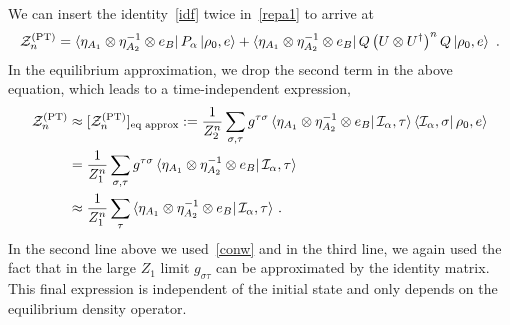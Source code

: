 \documentclass[a4paper,11pt]{article}
\newcommand\sig{\sigma}
\newcommand\da{{\dagger}}
\begin{document}
We can insert the identity~\eqref{idf} twice in~\eqref{repa1} to arrive at
\begin{align}
\label{PQ}
 \mathcal{Z}_n^{\rm (PT)} = \bra{\eta_{A_1} \otimes \eta^{-1}_{A_2} \otimes e_{B}}P_{\alpha}\ket{\rho_0, e} + \bra{\eta_{A_1} \otimes \eta^{-1}_{A_2} \otimes e_{B}}Q\left( U\otimes U^\da \right)^nQ\ket{\rho_0, e} \ .
\end{align}
In the equilibrium approximation, we drop the second term in the above equation, which leads to a time-independent expression, 
\begin{align}
 \mathcal{Z}_n^{(\rm PT)} &\approx [\mathcal{Z}_{n}^{(\rm PT)}]_{\text{eq approx}} := \frac{1}{Z_2^n} \sum_{\sigma, \tau} g^{\tau \sigma}\bra{\eta_{A_1} \otimes \eta^{-1}_{A_2} \otimes e_{B}}\mathcal{I}_{\alpha},\tau\rangle\bra{\mathcal{I}_{\alpha},\sigma}\rho_0,e\rangle
 \nonumber
 \\
 &=\frac{1}{Z_1^n} \sum_{\sigma, \tau} g^{\tau \sigma}\bra{\eta_{A_1} \otimes \eta^{-1}_{A_2} \otimes e_{B}}\mathcal{I}_{\alpha},\tau\rangle
 \nonumber
 \\
 &\approx\frac{1}{Z_1^n} \sum_{ \tau}\bra{\eta_{A_1} \otimes \eta^{-1}_{A_2} \otimes e_{B}}\mathcal{I}_{\alpha},\tau\rangle \ .
 \label{mastereq}
\end{align}
In the second line above we used~\eqref{conw} and in the third line, we again used the fact that in the large $Z_1$ limit $g_{\sig \tau}$ can be approximated by the identity matrix. 
This final expression is independent of the initial state and only depends on the equilibrium density operator. 
\end{document}
